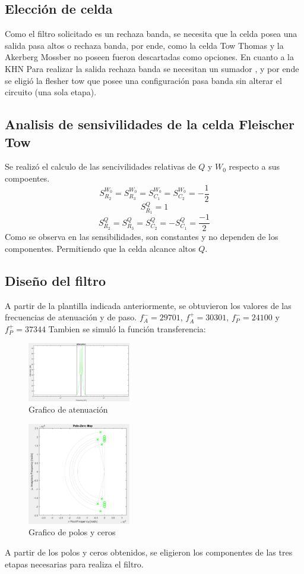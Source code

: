 \documentclass[../../tc_tp5_main.tex]{subfiles}
\begin{document}
\subsection{Elección de celda}
Como el filtro solicitado es un rechaza banda, se necesita que la celda posea una salida pasa altos o rechaza banda, por ende, como  la celda Tow Thomas y la Akerberg Mossber no poseen fueron descartadas como opciones. En cuanto a la KHN Para realizar la salida rechaza banda se necesitan un sumador , y por ende se eligió la flesher tow que posee una configuración pasa banda sin alterar el circuito (una sola etapa).
\subsection{Analisis de sensivilidades de la celda Fleischer Tow}
Se realizó el calculo de las sencivilidades relativas de $Q$ y $W_0$ respecto a sus compoentes.
$$S^{W_0}_{R_2}=S^{W_0}_{R_3}=S^{W_0}_{C_1}=S^{W_0}_{C_2}=- \frac{1}{2}$$
$$S^{Q}_{R_1}= 1$$
$$S^{Q}_{R_2}=S^{Q}_{R_3}=S^{Q}_{C_2}=-S^{Q}_{C_1}=\frac{-1}{2} $$
Como se observa en las sensibilidades, son constantes y no dependen de los componentes. Permitiendo que la celda alcance altos $Q$.


\subsection{Diseño del filtro}
A partir de la plantilla indicada anteriormente, se obtuvieron los valores de las frecuencias de atenuación y de paso.
$ f_A^-=29701 $, $f_A^+=30301 $, $ f_P^-=24100 $ y $ f_P^+=37344 $
Tambien se simuló la función transferencia:
\begin{figure}[H]	
	\centering
	\includegraphics[width=0.4\textwidth]{imagenes/atten.png}
	\caption{Grafico de atenuación}
\end{figure}
\begin{figure}[H]	
	\centering
	\includegraphics[width=0.4\textwidth]{imagenes/polezero.png}
	\caption{Grafico de polos y ceros}
\end{figure}
A partir de los polos y ceros obtenidos, se eligieron los componentes de las tres etapas necesarias para realiza el filtro.
\end{document}

